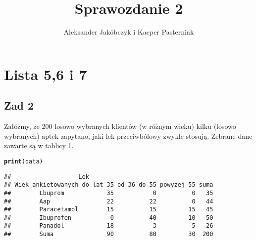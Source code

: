 \documentclass[12pt]{mwart}\usepackage[]{graphicx}\usepackage[]{color}
\title{Sprawozdanie 2}
\author{Aleksander Jakóbczyk i Kacper Pasterniak}
\date{}
\makeatletter
\newcommand{\hlstd}[1]{\textcolor[rgb]{0.345,0.345,0.345}{#1}}%
\newcommand{\hlkwd}[1]{\textcolor[rgb]{0.737,0.353,0.396}{\textbf{#1}}}%
\newenvironment{kframe}{%
 \def\at@end@of@kframe{}%
 \ifinner\ifhmode%
  \def\at@end@of@kframe{\end{minipage}}%
  \begin{minipage}{\columnwidth}%
 \fi\fi%
 \def\FrameCommand##1{\hskip\@totalleftmargin \hskip-\fboxsep
 \colorbox{shadecolor}{##1}\hskip-\fboxsep
     \hskip-\linewidth \hskip-\@totalleftmargin \hskip\columnwidth}%
 \MakeFramed {\advance\hsize-\width
   \@totalleftmargin\z@ \linewidth\hsize
   \@setminipage}}%
 {\par\unskip\endMakeFramed%
 \at@end@of@kframe}
\newenvironment{knitrout}{}{} %
\makeatother
\begin{document}
\maketitle



\section*{Lista 5,6 i 7}
\subsection*{Zad 2}
Załóżmy, że 200 losowo wybranych klientów (w różnym wieku) kilku (losowo wybranych) aptek zapytano, jaki lek przeciwbólowy zwykle stosują. Zebrane dane zawarte
są w tablicy 1.



\begin{knitrout}
\color{fgcolor}\begin{kframe}
\begin{alltt}
\hlkwd{print}\hlstd{(data)}
\end{alltt}
\begin{verbatim}
##                   Lek
## Wiek_ankietowanych do lat 35 od 36 do 55 powyżej 55 suma
##        Lbuprom            35           0          0   35
##        Aap                22          22          0   44
##        Paracetamol        15          15         15   45
##        Ibuprofen           0          40         10   50
##        Panadol            18           3          5   26
##        Suma               90          80         30  200
\end{verbatim}
\end{kframe}
\end{knitrout}
\end{document}
